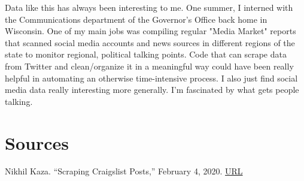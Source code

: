 \documentclass{article}
\begin{document}
Data like this has always been interesting to me. One summer, I interned with the Communications department of the Governor's Office back home in Wisconsin. One of my main jobs was compiling regular "Media Market" reports that scanned social media accounts and news sources in different regions of the state to monitor regional, political talking points. Code that can scrape data from Twitter and clean/organize it in a meaningful way could have been really helpful in automating an otherwise time-intensive process. I also just find social media data really interesting more generally. I'm fascinated by what gets people talking. 

\section{Sources}
Nikhil Kaza. “Scraping Craigslist Posts,” February 4, 2020. \href{http://www.nikhilkaza.com/post/2020-02-04-scraping-craigslist-posts/.}{URL}
\end{document}
